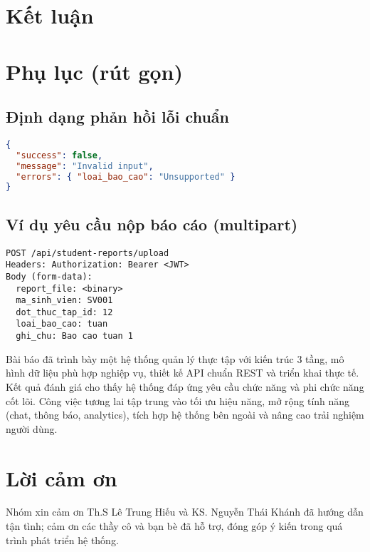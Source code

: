\documentclass[conference]{IEEEtran}
\begin{document}
\section{Kết luận}
\section*{Phụ lục (rút gọn)}
\subsection*{Định dạng phản hồi lỗi chuẩn}
\begin{lstlisting}[language=json]
{
  "success": false,
  "message": "Invalid input",
  "errors": { "loai_bao_cao": "Unsupported" }
}
\end{lstlisting}

\subsection*{Ví dụ yêu cầu nộp báo cáo (multipart)}
\begin{lstlisting}
POST /api/student-reports/upload
Headers: Authorization: Bearer <JWT>
Body (form-data):
  report_file: <binary>
  ma_sinh_vien: SV001
  dot_thuc_tap_id: 12
  loai_bao_cao: tuan
  ghi_chu: Bao cao tuan 1
\end{lstlisting}
Bài báo đã trình bày một hệ thống quản lý thực tập với kiến trúc 3 tầng, mô hình dữ liệu phù hợp nghiệp vụ, thiết kế API chuẩn REST và triển khai thực tế. Kết quả đánh giá cho thấy hệ thống đáp ứng yêu cầu chức năng và phi chức năng cốt lõi. Công việc tương lai tập trung vào tối ưu hiệu năng, mở rộng tính năng (chat, thông báo, analytics), tích hợp hệ thống bên ngoài và nâng cao trải nghiệm người dùng.

\section*{Lời cảm ơn}
Nhóm xin cảm ơn Th.S Lê Trung Hiếu và KS. Nguyễn Thái Khánh đã hướng dẫn tận tình; cảm ơn các thầy cô và bạn bè đã hỗ trợ, đóng góp ý kiến trong quá trình phát triển hệ thống.
\end{document}
